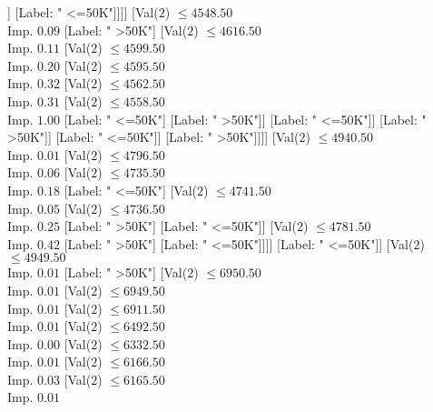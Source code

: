 \documentclass[margin=10pt]{standalone}
\begin{document}
\begin{forest}
																							[Label: " <=50K"]]
																						[Label: " <=50K"]]]]
																			[Val($2$) $ \leq 4548.50$ \\ Imp. $0.09$
																				[Label: " >50K"]
																				[Val($2$) $ \leq 4616.50$ \\ Imp. $0.11$
																					[Val($2$) $ \leq 4599.50$ \\ Imp. $0.20$
																						[Val($2$) $ \leq 4595.50$ \\ Imp. $0.32$
																							[Val($2$) $ \leq 4562.50$ \\ Imp. $0.31$
																								[Val($2$) $ \leq 4558.50$ \\ Imp. $1.00$
																									[Label: " <=50K"]
																									[Label: " >50K"]]
																								[Label: " <=50K"]]
																							[Label: " >50K"]]
																						[Label: " <=50K"]]
																					[Label: " >50K"]]]]
																		[Val($2$) $ \leq 4940.50$ \\ Imp. $0.01$
																			[Val($2$) $ \leq 4796.50$ \\ Imp. $0.06$
																				[Val($2$) $ \leq 4735.50$ \\ Imp. $0.18$
																					[Label: " <=50K"]
																					[Val($2$) $ \leq 4741.50$ \\ Imp. $0.05$
																						[Val($2$) $ \leq 4736.50$ \\ Imp. $0.25$
																							[Label: " >50K"]
																							[Label: " <=50K"]]
																						[Val($2$) $ \leq 4781.50$ \\ Imp. $0.42$
																							[Label: " >50K"]
																							[Label: " <=50K"]]]]
																				[Label: " <=50K"]]
																			[Val($2$) $ \leq 4949.50$ \\ Imp. $0.01$
																				[Label: " >50K"]
																				[Val($2$) $ \leq 6950.50$ \\ Imp. $0.01$
																					[Val($2$) $ \leq 6949.50$ \\ Imp. $0.01$
																						[Val($2$) $ \leq 6911.50$ \\ Imp. $0.01$
																							[Val($2$) $ \leq 6492.50$ \\ Imp. $0.00$
																								[Val($2$) $ \leq 6332.50$ \\ Imp. $0.01$
																									[Val($2$) $ \leq 6166.50$ \\ Imp. $0.03$
																										[Val($2$) $ \leq 6165.50$ \\ Imp. $0.01$

\end{forest}
\end{document}
